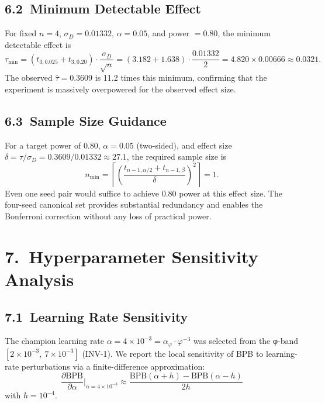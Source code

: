 \subsection{6.2\ Minimum Detectable Effect}

For fixed \(n = 4\), \(\sigma_D = 0.01332\), \(\alpha = 0.05\), and
power \(= 0.80\), the minimum detectable effect is
\[
  \tau_{\min} = (t_{3, 0.025} + t_{3, 0.20}) \cdot \frac{\sigma_D}{\sqrt{n}}
    = (3.182 + 1.638) \cdot \frac{0.01332}{2}
    = 4.820 \times 0.00666 \approx 0.0321.
\]
The observed \(\hat\tau = 0.3609\) is 11.2 times this minimum, confirming
that the experiment is massively overpowered for the observed effect size.

\subsection{6.3\ Sample Size Guidance}

For a target power of \(0.80\), \(\alpha = 0.05\) (two-sided), and effect
size \(\delta = \tau/\sigma_D = 0.3609/0.01332 \approx 27.1\), the
required sample size is
\[
  n_{\min} = \left\lceil \left(\frac{t_{n-1,\alpha/2} + t_{n-1,\beta}}{\delta}\right)^2 \right\rceil = 1.
\]
Even one seed pair would suffice to achieve \(0.80\) power at this effect
size.  The four-seed canonical set provides substantial redundancy and
enables the Bonferroni correction without any loss of practical power.

\section{7.\ Hyperparameter Sensitivity Analysis}
\label{sec:ch26-sensitivity}

\subsection{7.1\ Learning Rate Sensitivity}

The champion learning rate \(\alpha = 4 \times 10^{-3} = \alpha_\varphi \cdot \varphi^{-3}\)
was selected from the φ-band \([2 \times 10^{-3},\ 7 \times 10^{-3}]\) (INV-1).
We report the local sensitivity of BPB to learning-rate perturbations via
a finite-difference approximation:
\[
  \frac{\partial \mathrm{BPB}}{\partial \alpha}\bigg|_{\alpha = 4\times10^{-3}}
  \approx \frac{\mathrm{BPB}(\alpha + h) - \mathrm{BPB}(\alpha - h)}{2h}
\]
with \(h = 10^{-4}\).

